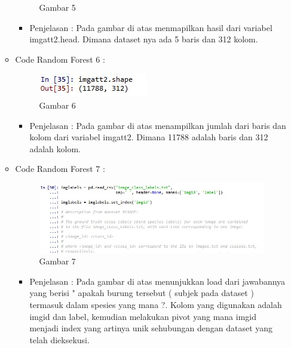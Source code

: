 \begin{enumerate}
\begin{itemize}
\begin{figure}[ht]
\caption{Gambar 5}
\label{contoh}
\end{figure}
\par
\begin{itemize}
\item Penjelasan : Pada gambar di atas menmapilkan hasil dari variabel imgatt2.head. Dimana dataset nya ada 5 baris dan 312 kolom.
\par
\par
\end{itemize}
\item Code Random Forest 6 :
\par
\begin{figure}[ht]
\centering
\includegraphics[scale=0.7]{figures/AFS/4f.jpg}
\caption{Gambar 6}
\label{contoh}
\end{figure}
\par
\begin{itemize}
\item Penjelasan : Pada gambar di atas menampilkan jumlah dari baris dan kolom dari variabel imgatt2. Dimana 11788 adalah baris dan 312 adalah kolom.
\par
\par
\end{itemize}
\item Code Random Forest 7 :
\par
\begin{figure}[ht]
\centering
\includegraphics[scale=0.7]{figures/AFS/4g.jpeg}
\caption{Gambar 7}
\label{contoh}
\end{figure}
\par
\begin{itemize}
\item Penjelasan : Pada gambar di atas menunjukkan load dari  jawabannya yang berisi " apakah burung tersebut ( subjek pada dataset ) termasuk dalam spesies yang mana ?. Kolom yang digunakan adalah imgid dan label, kemudian melakukan pivot yang mana imgid menjadi index yang artinya unik sehubungan dengan dataset yang telah dieksekusi.

\end{itemize}
\end{itemize}
\end{enumerate}

